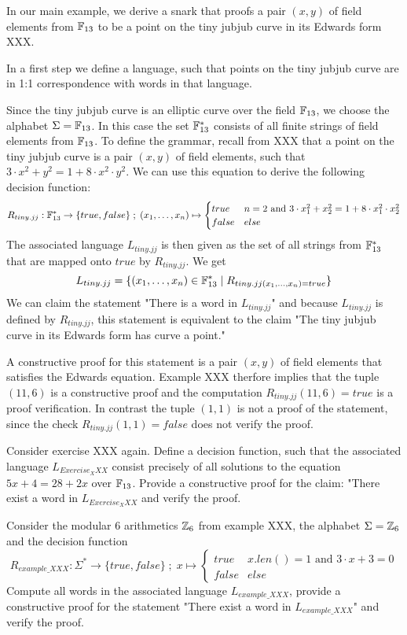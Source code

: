 \begin{example} In our main example, we derive a snark that proofs a pair $(x,y)$ of field elements from $\mathbb{F}_{13}$ to be a point on the tiny jubjub curve in its Edwards form XXX.

In a first step we define a language, such that points on the tiny jubjub curve are in 1:1 correspondence with words in that language.

Since the tiny jubjub curve is an elliptic curve over the field $\mathbb{F}_{13}$, we choose the alphabet $\Sigma = \mathbb{F}_{13}$. In this case the set $\mathbb{F}_{13}^*$ consists of all finite strings of field elements from $\mathbb{F}_{13}$. To define the grammar, recall from XXX that a point on the tiny jubjub curve is a pair $(x,y)$ of field elements, such that $3\cdot x^2 + y^2 = 1+ 8\cdot x^2\cdot y^2$. We can use this equation to derive the following decision function:
$$
R_{tiny.jj} : \mathbb{F}_{13}^* \to \{true, false\}\;;\;
(x_1,\ldots,x_n) \mapsto
\begin{cases}
true & n=2 \text{ and } 3\cdot x_1^2 + x_2^2 = 1+ 8\cdot x_1^2\cdot x_2^2\\
false & else
\end{cases}
$$
The associated language $L_{tiny.jj}$ is then given as the set of all strings from $\mathbb{F}_{13}^*$ that are mapped onto $true$ by $R_{tiny.jj}$. We get
$$
L_{tiny.jj} = \{(x_1,\ldots,x_n)\in \mathbb{F}_{13}^*\;|\; R_{tiny.jj(x_1,\ldots,x_n)=true}\}
$$
We can claim the statement "There is a word in $L_{tiny.jj}$" and because $L_{tiny.jj}$ is defined by $R_{tiny.jj}$, this statement is equivalent to the claim "The tiny jubjub curve in its Edwards form has curve a point." 

A constructive proof for this statement is a pair $(x,y)$ of field elements that satisfies the Edwards equation. Example XXX therfore implies that the tuple $(11,6)$ is a constructive proof and the computation $R_{tiny.jj}(11,6)=true$ is a proof verification. In contrast the tuple $(1,1)$ is not a proof of the statement, since the check $R_{tiny.jj}(1,1)=false$ does not verify the proof.
\end{example}
\begin{exercise} Consider exercise XXX again. Define a decision function, such that the associated language $L_{Exercise_XXX}$ consist precisely of all solutions to the equation $5x + 4 = 28 + 2x$ over $\mathbb{F}_{13}$. Provide a constructive proof for the claim: "There exist a word in $L_{Exercise_XXX}$ and verify the proof.  
\end{exercise}
\begin{exercise} Consider the modular $6$ arithmetics $\mathbb{Z}_6$ from example XXX, the alphabet $\Sigma = \mathbb{Z}_6$ and the decision function
\begin{equation*}
R_{example\_XXX} : \Sigma^*\to \{true, false\}\;;\;
x \mapsto
\begin{cases}
true & x.len()=1 \text{ and } 3\cdot x + 3 = 0\\
false & else
\end{cases}
\end{equation*}
Compute all words in the associated language $L_{example\_XXX}$, provide a constructive proof for the statement "There exist a word in $L_{example\_XXX}$" and verify the proof.
\end{exercise}
